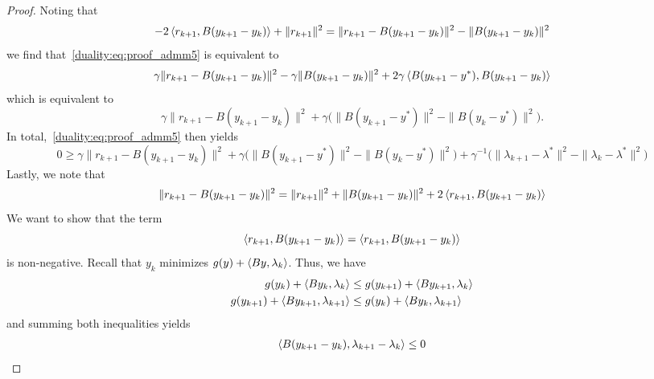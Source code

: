 \begin{proof}
    Noting that 
    \begin{equation}
        -2\left\langle r_{k+1} , B(y_{k+1}-y_k)\right\rangle + \|r_{k+1}\|^2 
        = \|r_{k+1} - B(y_{k+1}-y_k)\|^2 - \|B(y_{k+1}-y_k)\|^2
    \end{equation}
    we find that~\eqref{duality:eq:proof_admm5} is equivalent to 
    \begin{equation}
        \gamma \|r_{k+1} - B(y_{k+1}-y_k)\|^2 - \gamma\|B(y_{k+1}-y_k)\|^2 + 2\gamma\left\langle B(y_{k+1}-y^*) , B(y_{k+1}-y_k)\right\rangle
    \end{equation}
    which is equivalent to
    \begin{equation}
        \gamma \|r_{k+1} - B(y_{k+1}-y_k)\|^2 + \gamma\big( \|B(y_{k+1}-y^*)\|^2 - \|B(y_{k}-y^*)\|^2\big).
    \end{equation}
    In total,~\eqref{duality:eq:proof_admm5} then yields
    \begin{equation}
        0\geq \gamma \|r_{k+1} - B(y_{k+1}-y_k)\|^2 + \gamma\big( \|B(y_{k+1}-y^*)\|^2 - \|B(y_{k}-y^*)\|^2\big) + \gamma^{-1}\big(\|\lambda_{k+1}-\lambda^*\|^2 - \|\lambda_{k}-\lambda^*\|^2\big)
    \end{equation}
    Lastly, we note that
    \begin{equation}
        \|r_{k+1} - B(y_{k+1}-y_k)\|^2
        =\|r_{k+1}\|^2 + \|B(y_{k+1}-y_k)\|^2 + 2\left\langle r_{k+1} , B(y_{k+1}-y_k)\right\rangle
    \end{equation}
    We want to show that the term
    \begin{equation}
        \left\langle r_{k+1} , B(y_{k+1}-y_k)\right\rangle = \left\langle r_{k+1} , B(y_{k+1}-y_k)\right\rangle
    \end{equation}
    is non-negative. Recall that $y_k$ minimizes $g(y) + \left\langle By , \lambda_k\right\rangle$. Thus, we have
    \begin{equation}
        \begin{aligned}
            g(y_k) + \left\langle By_k , \lambda_k\right\rangle
            &\leq g(y_{k+1}) + \left\langle By_{k+1} , \lambda_k\right\rangle\\
            g(y_{k+1}) + \left\langle By_{k+1} , \lambda_{k+1}\right\rangle
            &\leq g(y_k) + \left\langle By_k , \lambda_{k+1}\right\rangle
        \end{aligned}
    \end{equation}
    and summing both inequalities yields
    \begin{equation}
        \begin{aligned}
            \left\langle B(y_{k+1}-y_k) , \lambda_{k+1}-\lambda_k\right\rangle
            \leq 0 
        \end{aligned}
    \end{equation}

\end{proof}
